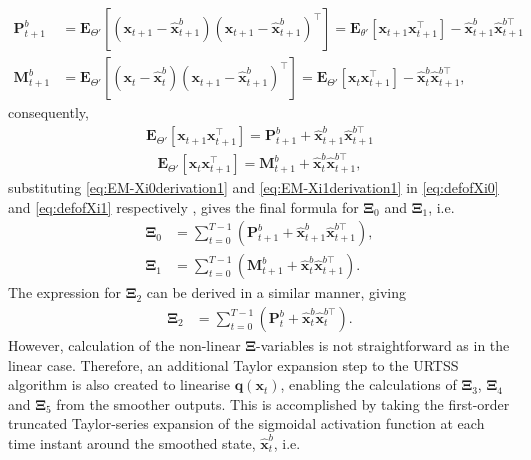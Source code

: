 \documentclass[]{article}
\begin{document}
\begin{align}
 \mathbf P_{t+1}^b&=\mathbf E_{\Theta'}\left[(\mathbf x_{t+1}-\mathbf{\hat x}_{t+1}^b)(\mathbf x_{t+1}-\mathbf{\hat x}_{t+1}^b)^{\top}\right]=\mathbf E_{\theta'}\left[\mathbf x_{t+1}\mathbf x_{t+1}^\top\right]-\mathbf {\hat x}_{t+1}^b\mathbf{\hat x}_{t+1}^{b\top}\label{eq:EM-PrimeryXi0derivation1}\\
 \mathbf M_{t+1}^b&=\mathbf E_{\Theta'}\left[(\mathbf x_t-\mathbf{\hat x}_t^b)(\mathbf x_{t+1}-\mathbf{\hat x}_{t+1}^b)^{\top}\right]= \mathbf E_{\Theta'}\left[\mathbf x_t\mathbf x_{t+1}^\top\right]-\mathbf {\hat x}_t^b\mathbf{\hat x}_{t+1}^{b\top},\label{eq:EM-PrimeryXi1derivation1}
\end{align}
consequently,
\begin{align}\label{eq:EM-Xi0derivation1}
 \mathbf E_{\Theta'}\left[\mathbf x_{t+1}\mathbf x_{t+1}^\top\right]=\mathbf P_{t+1}^b+\mathbf {\hat x}_{t+1}^b\mathbf{\hat x}_{t+1}^{b\top}
\end{align}
\begin{align}
 \mathbf E_{\Theta'}\left[\mathbf x_t\mathbf x_{t+1}^\top\right]=\mathbf M_{t+1}^b+\mathbf {\hat x}_t^b\mathbf{\hat x}_{t+1}^{b\top}\label{eq:EM-Xi1derivation1},
\end{align}
substituting \eqref{eq:EM-Xi0derivation1} and \eqref{eq:EM-Xi1derivation1} in \eqref{eq:defofXi0} and \eqref{eq:defofXi1} respectively , gives the final formula for $\boldsymbol\Xi_{0}$ and $\boldsymbol\Xi_{1}$, i.e.
\begin{align}
	\boldsymbol\Xi_{0}&=\sum_{t=0}^{T-1}\left(\mathbf P_{t+1}^b+\mathbf{\hat x}_{t+1}^b\mathbf{\hat x}_{t+1}^{b\top}\right)\label{eq:Xi0Gibson}, \\
\boldsymbol\Xi_{1}&=\sum_{t=0}^{T-1}\left(\mathbf M_{t+1}^b+\mathbf{\hat x}_t^b\mathbf{\hat x}_{t+1}^{b\top}\right) \label{eq:Xi1Gibson}.
\end{align}
The expression for $\boldsymbol\Xi_{2}$ can be derived in a similar manner, giving
\begin{align}
\boldsymbol\Xi_{2}&=\sum_{t=0}^{T-1}\left(\mathbf P_t^b+\mathbf{\hat x}_t^b\mathbf{\hat x}_t^{b\top}\right).\label{eq:Xi2Gibson}
\end{align}
However, calculation of the non-linear $\boldsymbol\Xi$-variables is not straightforward as in the linear case. Therefore, an additional Taylor expansion step to the URTSS algorithm is also created to linearise $\mathbf q(\mathbf{x}_t)$, enabling the calculations of $\boldsymbol\Xi_3$, $\boldsymbol\Xi_4$ and $\boldsymbol\Xi_5$ from the smoother outputs. This is accomplished by taking the first-order truncated Taylor-series expansion of the sigmoidal activation function at each time instant  around the smoothed state, $\hat{\mathbf x}_t^b$, i.e.
\end{document}
